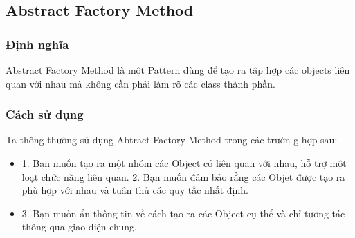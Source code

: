 \subsection{Abstract Factory Method}
\subsubsection{Định nghĩa}
Abstract Factory Method là một Pattern dùng để tạo ra tập hợp các objects liên quan với nhau mà không cần phải làm rõ các class thành phần.
\subsubsection{Cách sử dụng}
Ta thông thường sử dụng Abtract Factory Method trong các trườn g hợp sau:
\begin{itemize}
    \item 1. Bạn muốn tạo ra một nhóm các Object có liên quan với nhau, hỗ trợ một loạt chức năng liên quan.
    2. Bạn muốn đảm bảo rằng các Objet được tạo ra phù hợp với nhau và tuân thủ các quy tắc nhất định.
    \item 3. Bạn muốn ẩn thông tin về cách tạo ra các Object cụ thể và chỉ tương tác thông qua giao diện chung.
\end{itemize}
